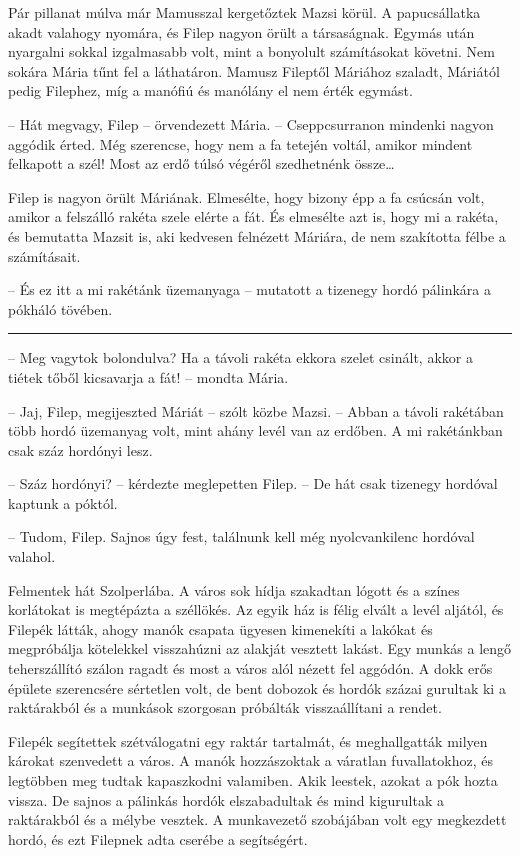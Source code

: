 \documentclass[10pt]{memoir}
\renewcommand{\pfbreakdisplay}{\bigskip \ding{166} \bigskip}
\newcommand{\secbreak}{\fancybreak{\pfbreakdisplay}\indent}
\begin{document}
Pár pillanat múlva már Mamusszal kergetőztek Mazsi körül. A papucsállatka akadt
valahogy nyomára, és Filep nagyon örült a társaságnak. Egymás után nyargalni
sokkal izgalmasabb volt, mint a bonyolult számításokat követni. Nem sokára
Mária tűnt fel a láthatáron. Mamusz Fileptől Máriához szaladt, Máriától pedig
Filephez, míg a manófiú és manólány el nem érték egymást.

-- Hát megvagy, Filep -- örvendezett Mária. -- Cseppcsurranon mindenki
nagyon aggódik érted. Még szerencse, hogy nem a fa tetején voltál, amikor
mindent felkapott a szél! Most az erdő túlsó végéről szedhetnénk össze\dots

Filep is nagyon örült Máriának. Elmesélte, hogy bizony épp a fa csúcsán volt,
amikor a felszálló rakéta szele elérte a fát. És elmesélte azt is, hogy mi a
rakéta, és bemutatta Mazsit is, aki kedvesen felnézett Máriára, de nem
szakította félbe a számításait.

-- És ez itt a mi rakétánk üzemanyaga -- mutatott a tizenegy hordó pálinkára
a pókháló tövében.

\secbreak

-- Meg vagytok bolondulva? Ha a távoli rakéta ekkora szelet csinált, akkor a
tiétek tőből kicsavarja a fát! -- mondta Mária.

-- Jaj, Filep, megijeszted Máriát -- szólt közbe Mazsi. -- Abban a távoli
rakétában több hordó üzemanyag volt, mint ahány levél van az erdőben. A mi
rakétánkban csak száz hordónyi lesz.

-- Száz hordónyi? -- kérdezte meglepetten Filep. -- De hát csak tizenegy
hordóval kaptunk a póktól.

-- Tudom, Filep. Sajnos úgy fest, találnunk kell még nyolcvankilenc hordóval
valahol.

Felmentek hát Szolperlába. A város sok hídja szakadtan lógott és a színes
korlátokat is megtépázta a széllökés. Az egyik ház is félig elvált a levél
aljától, és Filepék látták, ahogy manók csapata ügyesen kimenekíti a lakókat és
megpróbálja kötelekkel visszahúzni az alakját vesztett lakást. Egy munkás a
lengő teherszállító szálon ragadt és most a város alól nézett fel aggódón. A
dokk erős épülete szerencsére sértetlen volt, de bent dobozok és hordók százai
gurultak ki a raktárakból és a munkások szorgosan próbálták visszaállítani a
rendet.

Filepék segítettek szétválogatni egy raktár tartalmát, és meghallgatták milyen
károkat szenvedett a város. A manók hozzászoktak a váratlan fuvallatokhoz, és
legtöbben meg tudtak kapaszkodni valamiben. Akik leestek, azokat a pók hozta
vissza. De sajnos a pálinkás hordók elszabadultak és mind kigurultak a
raktárakból és a mélybe vesztek. A munkavezető szobájában volt egy megkezdett
hordó, és ezt Filepnek adta cserébe a segítségért.
\end{document}
